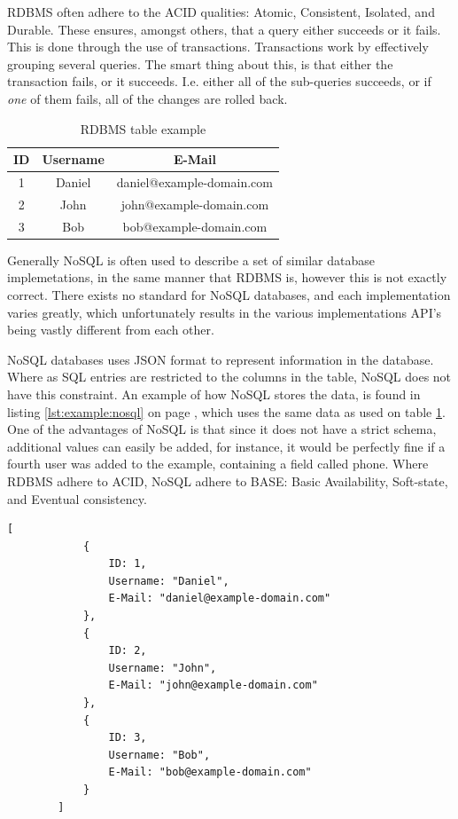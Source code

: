 		RDBMS often adhere to the ACID qualities: Atomic, Consistent, Isolated, and Durable. These ensures, amongst others, that a query either succeeds or it fails. This is done through the use of transactions. Transactions work by effectively grouping several queries. The smart thing about this, is that either the transaction fails, or it succeeds. I.e. either all of the sub-queries succeeds, or if \emph{one} of them fails, all of the changes are rolled back.

		\begin{table}[h!]
			\centering
			\begin{tabular}{|c|c|c|}
				\hline
				\textbf{ID} 		& 	\textbf{Username} 		& \textbf{E-Mail} 		\\
				\hline
				1 					& Daniel 					& daniel@example-domain.com 		\\
				\hline
				2 					& John 						& john@example-domain.com 	\\
				\hline
				3 					& Bob 						& bob@example-domain.com 	\\
				\hline
			\end{tabular}
			\caption{RDBMS table example}
			\label{fig:example:rldb}
		\end{table}

		Generally NoSQL is often used to describe a set of similar database implemetations, in the same manner that RDBMS is, however this is not exactly correct. There exists no standard for NoSQL databases, and each implementation varies greatly, which unfortunately results in the various implementations API's being vastly different from each other.

		NoSQL databases uses JSON format to represent information in the database. Where as SQL entries are restricted to the columns in the table, NoSQL does not have this constraint. An example of how NoSQL stores the data, is found in listing \ref{lst:example:nosql} on page \pageref{lst:example:nosql}, which uses the same data as used on table \ref{fig:example:rldb}. One of the advantages of NoSQL is that since it does not have a strict schema, additional values can easily be added, for instance, it would be perfectly fine if a fourth user was added to the example, containing a field called phone. Where RDBMS adhere to ACID, NoSQL adhere to BASE: Basic Availability, Soft-state, and Eventual consistency.

		\begin{lstlisting}[style=json2,gobble=8, caption={NoSQL table example},label={lst:example:nosql}]
        [
            {
                ID: 1,
                Username: "Daniel",
                E-Mail: "daniel@example-domain.com"
            },
            {
                ID: 2,
                Username: "John",
                E-Mail: "john@example-domain.com"
            },
            {
                ID: 3,
                Username: "Bob",
                E-Mail: "bob@example-domain.com"
            }
        ]
		\end{lstlisting}

